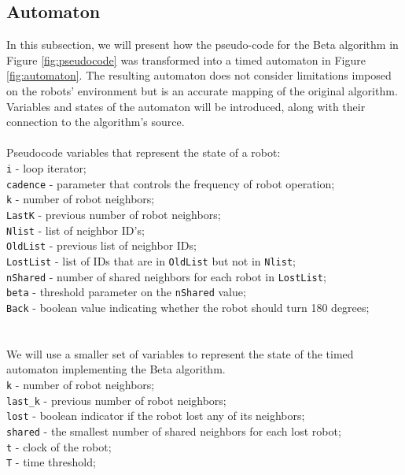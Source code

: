 \subsection{Automaton}
In this subsection, we will present how the pseudo-code for the Beta algorithm in Figure \ref{fig:pseudocode} was transformed into a timed automaton in Figure \ref{fig:automaton}. The resulting automaton does not consider limitations imposed on the robots' environment but is an accurate mapping of the original algorithm. Variables and states of the automaton will be introduced, along with their connection to the algorithm's source.
\\\\
Pseudocode variables that represent the state of a robot:\\
\texttt{i} - loop iterator;\\
\texttt{cadence} - parameter that controls the frequency of robot operation;\\
\texttt{k} - number of robot neighbors;\\
\texttt{LastK} - previous number of robot neighbors;\\
\texttt{Nlist} - list of neighbor ID's;\\
\texttt{OldList} - previous list of neighbor IDs;\\
\texttt{LostList} - list of IDs that are in \texttt{OldList} but not in \texttt{Nlist};\\
\texttt{nShared} - number of shared neighbors for each robot in \texttt{LostList};\\
\texttt{beta} - threshold parameter on the \texttt{nShared} value;\\
\texttt{Back} - boolean value indicating whether the robot should turn 180 degrees;\\
\\\\
We will use a smaller set of variables to represent the state of the timed automaton implementing the Beta algorithm.\\
\texttt{k} - number of robot neighbors;\\
\texttt{last\_k} - previous number of robot neighbors;\\
\texttt{lost} - boolean indicator if the robot lost any of its neighbors;\\
\texttt{shared} - the smallest number of shared neighbors for each lost robot;\\
\texttt{t} - clock of the robot;\\
\texttt{T} - time threshold;
\\\\
